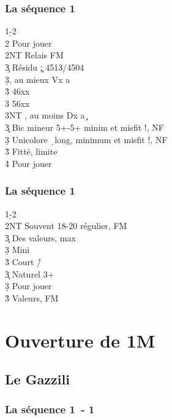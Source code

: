 \documentclass[a4paper]{article}
\begin{document}
\subsubsection{La séquence 1\pdfh}

\begin{bidtable}
1\d-2\h\\
2\s \> Pour jouer\\
2NT \> Relais FM\+\\
3\c \> Résidu \c ; 4513/4504\\
3\d {}, au mieux Vx a \c \\
3\h \> 46xx\\
3\s \> 56xx\\
3NT , au moins Dx a \c \-\\
3\c \> Bic mineur 5+-5+ minim et misfit !, NF\\
3\d \> Unicolore \d\ long, minimum et misfit !, NF\\
3\h\s \> Fitté, limite\\
4\h\s \> Pour jouer
\end{bidtable}

\subsubsection{La séquence 1\pdfs}

\begin{bidtable}
1\d-2\s\\
2NT \> Souvent 18-20 régulier, FM\+\\
3\c \> Des valeurs, max\\
3\d \> Mini\\
3\h\s \> Court \h /\s \-\\
3\c \> Naturel 3+ \s \\
3\d \> Pour jouer\\
3\h\s \> Valeurs, FM
\end{bidtable}

\section{Ouverture de 1M}

\subsection{Le Gazzili}

\subsubsection{La séquence 1\pdfh\ - 1\pdfs}
\end{document}
